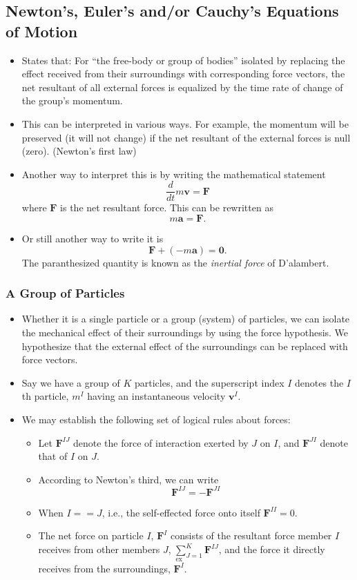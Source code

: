 \documentclass[11pt]{article}
\begin{document}
\subsection*{Newton's, Euler's and/or Cauchy's Equations of Motion}
\label{sec:orga3a3495}
\begin{itemize}
\item States that: For ``the free-body or group of bodies'' isolated by replacing the effect received from their surroundings with corresponding force vectors, the net resultant of all external forces is equalized by the time rate of change of the group's momentum.
\item This can be interpreted in various ways. For example, the momentum will be preserved (it will not change) if the net resultant of the external forces is null (zero). (Newton's first law)
\item Another way to interpret this is by writing the mathematical statement
$$ \frac{d}{dt}m\boldsymbol{v} = \boldsymbol{F} $$
where \(\boldsymbol{F}\) is the net resultant force. This can be rewritten as
$$ m\boldsymbol{a} = \boldsymbol{F}. $$
\item Or still another way to write it is
$$  \boldsymbol{F} + (-m\boldsymbol{a}) = \boldsymbol{0}. $$
The paranthesized quantity is known as the \emph{inertial force} of D'alambert.
\end{itemize}
\subsubsection*{A Group of Particles}
\label{sec:orgd76a901}
\begin{itemize}
\item Whether it is a single particle or a group (system) of particles, we can isolate the mechanical effect of their surroundings by using the force hypothesis. We hypothesize that the external effect of the surroundings can be replaced with force vectors.
\item Say we have a group of \(K\) particles, and the superscript index \(I\) denotes the \(I\) th particle, \(m^I\) having an instantaneous velocity \(\boldsymbol{v}^I\).
\item We may establish the following set of logical rules about forces:
\begin{itemize}
\item Let \(\boldsymbol{F}^{IJ}\) denote the force of interaction exerted by \(J\) on \(I\), and \(\boldsymbol{F}^{JI}\) denote that of \(I\) on \(J\).
\item According to Newton's third, we can write
$$ \boldsymbol{F}^{IJ} = -\boldsymbol{F}^{JI} $$
\item When \(I==J\), i.e., the self-effected force onto itself \(\boldsymbol{F}^{II} = 0\).
\item The net force on particle \(I\), \(\boldsymbol{F}^{I}\) consists of the resultant force member \(I\) receives from other members \(J\), \(\sum_{J=1}^K \boldsymbol{F}^{IJ}\), and the force it directly receives from the surroundings, \(\overset{\mathrm{ex}}{\boldsymbol{F}^I}\).
\end{itemize}
\end{itemize}
\end{document}
